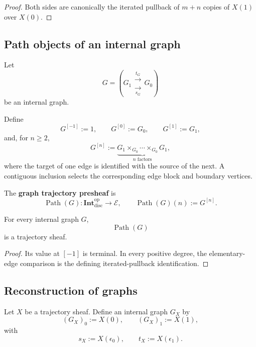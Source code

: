 \begin{proof}
Both sides are canonically the iterated pullback of \(m+n\) copies of
\(X(1)\) over \(X(0)\).
\end{proof}

\subsection{Path objects of an internal graph}
\label{subsec:path-objects-internal-graph}

Let
\[
    G=
    \left(
    G_1
    \mathrel{\substack{\xrightarrow{t_G}\\[-0.4em]\xrightarrow[s_G]{}}}
    G_0
    \right)
\]
be an internal graph.

Define
\[
    G^{[-1]}:=1,
    \qquad
    G^{[0]}:=G_0,
    \qquad
    G^{[1]}:=G_1,
\]
and, for \(n\geq2\),
\[
    G^{[n]}
    :=
    \underbrace{
    G_1\times_{G_0}\cdots\times_{G_0}G_1
    }_{n\text{ factors}},
\]
where the target of one edge is identified with the source of the next.
A contiguous inclusion selects the corresponding edge block and boundary
vertices.

\begin{definition}
\label{def:graph-trajectory-presheaf}
The \textbf{graph trajectory presheaf} is
\[
    \operatorname{Path}(G):
    \mathbf{Int}_{\mathrm{disc}}^{\mathrm{op}}
    \to
    \mathcal E,
    \qquad
    \operatorname{Path}(G)(n):=G^{[n]}.
\]
\end{definition}

\begin{proposition}
\label{prop:temporal-gluing-graph-paths}
For every internal graph \(G\),
\[
    \operatorname{Path}(G)
\]
is a trajectory sheaf.
\end{proposition}

\begin{proof}
Its value at \([-1]\) is terminal. In every positive degree, the
 elementary-edge comparison is the defining iterated-pullback
identification.
\end{proof}

\subsection{Reconstruction of graphs}
\label{subsec:reconstruction-graphs}

Let \(X\) be a trajectory sheaf. Define an internal graph \(G_X\) by
\[
    (G_X)_0:=X(0),
    \qquad
    (G_X)_1:=X(1),
\]
with
\[
    s_X:=X(\epsilon_0),
    \qquad
    t_X:=X(\epsilon_1).
\]

